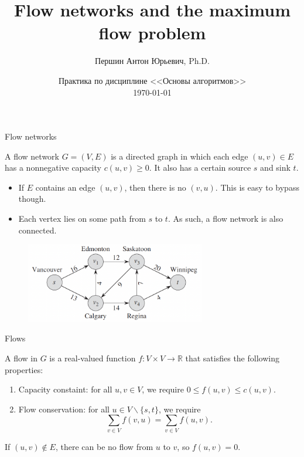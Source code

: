 \documentclass{beamer}
\title{Flow networks and the maximum flow problem}
\date[\today]{Практика по дисциплине <<Основы алгоритмов>>\\\today}
\author[Anton]{Першин Антон Юрьевич, Ph.D.}
\institute{Программа <<Большие данные и распределенная цифровая платформа>>\\Санкт-Петербургский государственный университет}
\begin{document}
\begin{frame}
\titlepage
\end{frame}

\setcounter{framenumber}{0}

\section{}

\begin{frame}{Flow networks}
    \small

    \begin{definition}
        A flow network $G = (V, E)$ is a directed graph in which each edge $(u, v) \in E$ has a nonnegative capacity $c(u, v) \geq 0$. It also has a certain source $s$ and sink $t$.
    \end{definition}

    \begin{itemize}
        \item If $E$ contains an edge $(u, v)$, then there is no $(v, u)$. This is easy to bypass though.
        \item Each vertex lies on some path from $s$ to $t$. As such, a flow network is also connected.
    \end{itemize}

    \begin{figure}[H]
        \includegraphics[width=0.7\textwidth]{images/flow_network.png}
    \end{figure}
\end{frame}

\begin{frame}{Flows}
    \small

    \begin{definition}
        A flow in $G$ is a real-valued function $f: V \times V \to \mathbb{R}$ that satisfies the following properties:
        \begin{enumerate}
            \item Capacity constaint: for all $u, v \in V$, we require $0 \leq f(u, v) \leq c(u, v)$.
            \item Flow conservation: for all $u \in V \backslash \{s, t\}$, we require
            \begin{equation}
                \sum_{v \in V} f(v, u) = \sum_{v \in V} f(u, v).
            \end{equation}
        \end{enumerate}
        If $(u, v) \notin E$, there can be no flow from $u$ to $v$, so $f(u, v) = 0$.
    \end{definition}
\end{frame}
\end{document}
